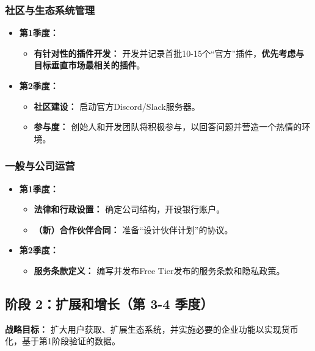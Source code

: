 \documentclass[11pt, a4paper, oneside]{article}
\begin{document}
\subsubsection*{社区与生态系统管理}
\begin{itemize}[leftmargin=*]
    \item \textbf{第1季度：}
    \begin{itemize}
        \item \textbf{有针对性的插件开发：} 开发并记录首批10-15个“官方”插件，\textbf{优先考虑与目标垂直市场最相关的插件}。
    \end{itemize}
    \item \textbf{第2季度：}
    \begin{itemize}
        \item \textbf{社区建设：} 启动官方Discord/Slack服务器。
        \item \textbf{参与度：} 创始人和开发团队将积极参与，以回答问题并营造一个热情的环境。
    \end{itemize}
\end{itemize}

\subsubsection*{一般与公司运营}
\begin{itemize}[leftmargin=*]
    \item \textbf{第1季度：}
    \begin{itemize}
        \item \textbf{法律和行政设置：} 确定公司结构，开设银行账户。
        \item \textbf{（新）合作伙伴合同：} 准备“设计伙伴计划”的协议。
    \end{itemize}
    \item \textbf{第2季度：}
    \begin{itemize}
        \item \textbf{服务条款定义：} 编写并发布Free Tier发布的服务条款和隐私政策。
    \end{itemize}
\end{itemize}

\clearpage

\subsection{阶段 2：扩展和增长（第 3-4 季度）}
\textbf{战略目标：} 扩大用户获取、扩展生态系统，并实施必要的企业功能以实现货币化，基于第1阶段验证的数据。
\end{document}
